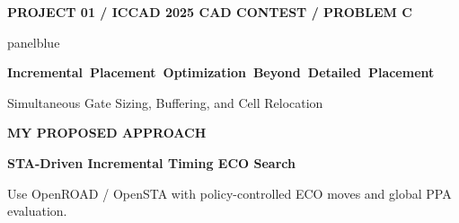 \documentclass[aspectratio=169,10pt]{beamer}
\newcommand{\smalllabel}[1]{{\scriptsize\bfseries\color{Accent}\MakeUppercase{#1}}}
\newcommand{\slidenavigation}{}
\newcommand{\slideposition}{}
\begin{document}
{
\renewcommand{\slidenavigation}{\hyperlink{details-index}{\beamerbutton{Details index}}\hspace{.12cm}\hyperlink{detail-pd-flow}{\beamerbutton{PD Flow}}}
\renewcommand{\slideposition}{Summary 5 / 18}
\begin{frame}[plain,label=summary-5]
  \vfill
  \smalllabel{Project 01 / ICCAD 2025 CAD Contest / Problem C}\par
  \vspace{.40cm}
  \begin{beamercolorbox}[rounded=true,sep=.25cm,wd=\linewidth]{panelblue}
    {\fontsize{13.6}{17}\selectfont\bfseries\color{Ink}
    \mbox{Incremental Placement Optimization Beyond Detailed Placement}\par}
    \vspace{.14cm}
    {\normalsize\color{Ink}
      Simultaneous Gate Sizing, Buffering, and Cell Relocation\par}
  \end{beamercolorbox}
  \vspace{.80cm}
  \smalllabel{My Proposed Approach}\par
  \vspace{.17cm}
  {\fontsize{18}{23}\selectfont\bfseries\color{Accent}
    STA-Driven Incremental Timing ECO Search\par}
  \vspace{.18cm}
  {\small\color{Muted}
    Use OpenROAD / OpenSTA with policy-controlled ECO moves and global PPA evaluation.\par}
  \vfill
\end{frame}}
\renewcommand{\slidenavigation}{\hyperlink{details-index}{\beamerbutton{Details index}}\hspace{.12cm}\hyperlink{detail-quality}{\beamerbutton{QoR scoring}}\hspace{.12cm}\hyperlink{detail-pd-flow}{\beamerbutton{PD Flow}}}
\end{document}
